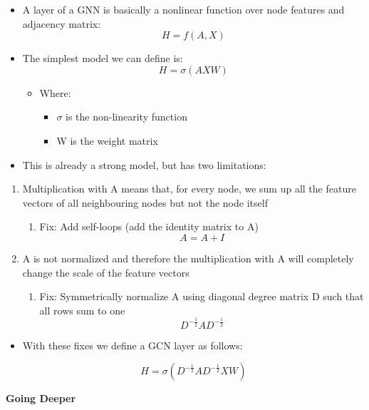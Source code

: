 \begin{itemize}
    \item A layer of a GNN is basically a nonlinear function over node features and adjacency
matrix:
\[ H = f(A, X) \]
\item The simplest model we can define is:
\[ H = \sigma(AXW) \]
\begin{itemize}
    \item Where:
    \begin{itemize}
        \item  $\sigma$ is the non-linearity function
    \end{itemize}
    \begin{itemize}
        \item W is the weight matrix
    \end{itemize}
\end{itemize}
\item This is already a strong model, but has two limitations:

\end{itemize}
\begin{enumerate}
    \item Multiplication with A means that, for every node, we sum up all the feature vectors of all neighbouring nodes but not the node itself
    \begin{enumerate}
        \item Fix: Add self-loops (add the identity matrix to A) 
\[ A = A + I \]
    \end{enumerate}
    \item A is not normalized and therefore the multiplication with A will completely change the scale of the feature vectors
    \begin{enumerate}
        \item Fix: Symmetrically normalize A using diagonal degree matrix D such that all rows sum to one
\[ D^{-\frac{1}{2}}AD^{-\frac{1}{2}} \]

    \end{enumerate}
\end{enumerate}
\begin{itemize}
    \item With these fixes we define a GCN layer as follows:

\[ H = \sigma(D^{-\frac{1}{2}}AD^{-\frac{1}{2}}XW) \]


\end{itemize}

\textbf{Going Deeper}

